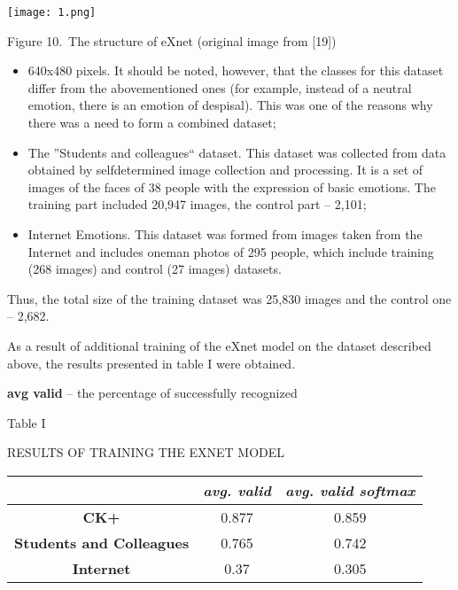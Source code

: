 \documentclass{report}
\begin{document}
        

\setcounter{page}{199}

\begin{multicols}{2}

\begin{center}
\texttt{[image: 1.png]}
\parbox[c]{16.4cm}{\scriptsize{Figure 10.~}The structure of eXnet (original image from [19])}
\end{center}

\begin{itemize}
    \item [\text{}] 640x480 pixels. It should be noted, however, that
the classes for this dataset differ from the abovementioned ones (for example, instead of a neutral
emotion, there is an emotion of despisal). This was
one of the reasons why there was a need to form
a combined dataset;
    \item [\text{2)}]The ”Students and colleagues“ dataset. This
dataset was collected from data obtained by selfdetermined image collection and processing. It is
a set of images of the faces of 38 people with
the expression of basic emotions. The training part
included 20,947 images, the control part – 2,101;
    \item [\text{3)}]Internet Emotions. This dataset was formed from
images taken from the Internet and includes oneman photos of 295 people, which include training
(268 images) and control (27 images) datasets.
\end{itemize}

\par Thus, the total size of the training dataset was 25,830
images and the control one – 2,682.
\par As a result of additional training of the eXnet model
on the dataset described above, the results presented in
table I were obtained.
\par \textbf{avg valid} – the percentage of successfully recognized

\columnbreak


\begin{center}
\par Table I

\scriptsize \par {\small R}ESULTS OF TRAINING THE E{\small X}NET MODEL
\vspace{0.25cm}

\begin{tabular}{ |c|c|c| } 
 \hline 
 &\textit{\textbf{avg. valid}}&\textit{\textbf{avg. valid softmax}}\\
 \hline
 \textbf{CK+}&0.877&0.859\\
 \hline
 \textbf{Students and Colleagues}&0.765&0.742\\
 \hline
 \textbf{Internet}&0.37&0.305\\
 \hline
\end{tabular}
\end{center}


\end{multicols}
\end{document}
